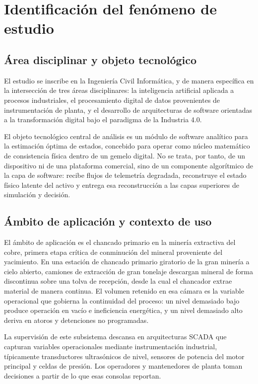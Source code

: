 \section{Identificación del fenómeno de estudio}
\label{sec:fenomeno}

\subsection{Área disciplinar y objeto tecnológico}

El estudio se inscribe en la Ingeniería Civil Informática, y de manera
específica en la intersección de tres áreas disciplinares: la inteligencia
artificial aplicada a procesos industriales, el procesamiento digital de datos
provenientes de instrumentación de planta, y el desarrollo de arquitecturas de
software orientadas a la transformación digital bajo el paradigma de la
Industria 4.0.

El objeto tecnológico central de análisis es un módulo de software analítico
para la estimación óptima de estados, concebido para operar como núcleo
matemático de consistencia física dentro de un gemelo digital. No se trata, por
tanto, de un dispositivo ni de una plataforma comercial, sino de un componente
algorítmico de la capa de software: recibe flujos de telemetría degradada,
reconstruye el estado físico latente del activo y entrega esa reconstrucción a
las capas superiores de simulación y decisión.

\subsection{Ámbito de aplicación y contexto de uso}

El ámbito de aplicación es el chancado primario en la minería extractiva del
cobre, primera etapa crítica de conminución del mineral proveniente del
yacimiento. En una estación de chancado primario giratorio de la gran minería a
cielo abierto, camiones de extracción de gran tonelaje descargan mineral de
forma discontinua sobre una tolva de recepción, desde la cual el chancador
extrae material de manera continua. El volumen retenido en esa cámara es la
variable operacional que gobierna la continuidad del proceso: un nivel demasiado
bajo produce operación en vacío e ineficiencia energética, y un nivel demasiado
alto deriva en atoros y detenciones no programadas.

La supervisión de este subsistema descansa en arquitecturas SCADA que capturan
variables operacionales mediante instrumentación industrial, típicamente
transductores ultrasónicos de nivel, sensores de potencia del motor principal y
celdas de presión. Los operadores y mantenedores de planta toman decisiones a
partir de lo que esas consolas reportan.

